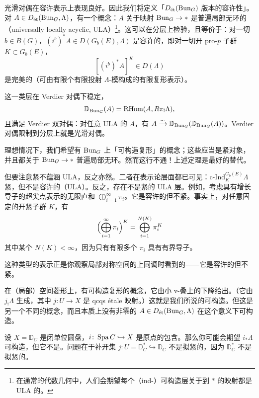 光滑对偶在容许表示上表现良好。因此我们将定义「$D_{\et}(\Bun_G)$ 版本的容许性」。对 $A\in D_{\et}(\Bun_G,\Lambda)$，有一个概念：$A$ 关于映射 $\Bun_G\to*$ 是普遍局部无环的（universally locally acyclic, ULA）\footnote{在通常的代数几何中，人们会期望每个（ind-）可构造层关于到 $*$ 的映射都是 ULA 的。}。这可以在分层上检验，且等价于：对一切 $b\in B(G)$，$(i^b)^*A\in D(G_b(E),\Lambda)$ 是容许的，即对一切开 pro-$p$ 子群 $K\subset G_b(E)$，
\[
[(i^b)^*A]^K\in D(\Lambda)
\]
是完美的（可由有限个有限投射 $\Lambda$-模构成的有限复形表示）。

这一类层在 Verdier 对偶下稳定，
\[
\mathbb{D}_{\Bun_G}(A)=\mathrm{RHom}(A,R\pi_!\Lambda),
\]
且满足 Verdier 双对偶：对任意 ULA 的 $A$，有 $A\xrightarrow{\sim}\mathbb{D}_{\Bun_G}(\mathbb{D}_{\Bun_G}(A))$。Verdier 对偶限制到分层上就是光滑对偶。

\begin{remark}
理想情况下，我们希望有 $\Bun_G$ 上「可构造复形」的概念；这些应当是紧对象，并且都关于 $\Bun_G\to*$ 普遍局部无环。然而这行不通！上述定理是最好的替代。


但要注意紧不蕴涵 ULA，反之亦然。二者在表示论层面都已可见：$\mathrm{c}\text{-}\mathrm{Ind}^{G_b(E)}_K\Lambda$ 紧，但不是容许的（ULA）。反之，存在不是紧的 ULA 层。例如，考虑具有增长导子的超尖点表示的无限直和 $\bigoplus_{i=1}^\infty\pi_i$。它是容许的但不紧。事实上，对任意固定的开紧子群 $K$，有
\[
\Bigl(\bigoplus_{i=1}^\infty\pi_i\Bigr)^K=\bigoplus_{i=1}^{N(K)}\pi_i^K
\]
其中某个 $N(K)<\infty$，因为只有有限多个 $\pi_i$ 具有有界导子。

这种类型的表示正是你观察局部对称空间的上同调时看到的——它是容许的但不紧。
\end{remark}

\begin{warning}
在（局部）空间菱形上，有可构造复形的概念，它由小 v-叠上的下降给出。（它由 $j_!\Lambda$ 生成，其中 $j\colon U\to X$ 是 qcqs étale 映射。）这就是我们所说的可构造。但这是另一个不同的概念，而且本质上没有非零的 $A\in D_{\et}(\Bun_G,\Lambda)$ 在这个意义下可构造。
\end{warning}

\begin{example}
设 $X=\mathbb{D}_C$ 是闭单位圆盘，$i\colon\Spa C\hookrightarrow X$ 是原点的包含。那么你可能会期望 $i_*\Lambda$ 可构造，但它不是。问题在于补开集 $j\colon U=\mathbb{D}^*_C\hookrightarrow\mathbb{D}_C$ 不是拟紧的，因为 $\mathbb{D}^*_C$ 不是拟紧的。
\end{example}

